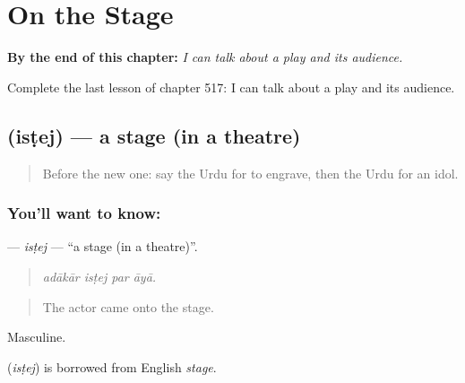 
\chapter{On the Stage}
\label{ch:ur-on-the-stage}

\begin{chapteropening}
\textbf{By the end of this chapter:} \emph{I can talk about a play and its audience.}

Complete the last lesson of chapter 517: I can talk about a play and its audience.
\end{chapteropening}

\section[\texorpdfstring{\ur{اسٹیج} (isṭej)}{اسٹیج (isṭej)}]{ (isṭej) — a stage (in a theatre)}

\label{lesson:UR-C517-istej}



\begin{quote}
Before the new one: say the Urdu for to engrave, then the Urdu for an idol.
\end{quote}

\subsection*{You'll want to know: }
\textbf{} — \emph{isṭej} — \textquotedblleft{}a stage (in a theatre)\textquotedblright{}.

\begin{quote}
   
\end{quote}

\begin{quote}
\emph{adākār isṭej par āyā.}
\end{quote}

\begin{quote}
The actor came onto the stage.
\end{quote}

Masculine.

\begin{cousinweb}
\textbf{} (\emph{isṭej}) is borrowed from English \emph{stage}.
\end{cousinweb}


